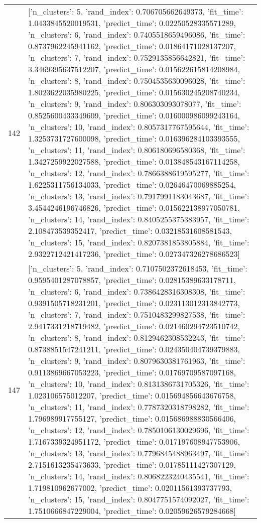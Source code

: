 \begin{tabular}{rl}
142 & [{'n_clusters': 5, 'rand_index': 0.706705662649373, 'fit_time': 1.0433845520019531, 'predict_time': 0.02250528335571289}, {'n_clusters': 6, 'rand_index': 0.7405518659496086, 'fit_time': 0.8737962245941162, 'predict_time': 0.01864171028137207}, {'n_clusters': 7, 'rand_index': 0.7529135856642821, 'fit_time': 3.3469395637512207, 'predict_time': 0.015622615814208984}, {'n_clusters': 8, 'rand_index': 0.7504535630096028, 'fit_time': 1.8023622035980225, 'predict_time': 0.015630245208740234}, {'n_clusters': 9, 'rand_index': 0.806303093078077, 'fit_time': 0.8525600433349609, 'predict_time': 0.016000986099243164}, {'n_clusters': 10, 'rand_index': 0.8057317767595644, 'fit_time': 1.3253731727600098, 'predict_time': 0.016396284103393555}, {'n_clusters': 11, 'rand_index': 0.806180696580368, 'fit_time': 1.3427259922027588, 'predict_time': 0.013848543167114258}, {'n_clusters': 12, 'rand_index': 0.7866388619595277, 'fit_time': 1.6225311756134033, 'predict_time': 0.02646470069885254}, {'n_clusters': 13, 'rand_index': 0.7917991183043687, 'fit_time': 3.4544246196746826, 'predict_time': 0.015622138977050781}, {'n_clusters': 14, 'rand_index': 0.8405255375383957, 'fit_time': 2.108473539352417, 'predict_time': 0.03218531608581543}, {'n_clusters': 15, 'rand_index': 0.8207381853805884, 'fit_time': 2.9322712421417236, 'predict_time': 0.027347326278686523}] \\
147 & [{'n_clusters': 5, 'rand_index': 0.7107502372618453, 'fit_time': 0.9595401287078857, 'predict_time': 0.02815389633178711}, {'n_clusters': 6, 'rand_index': 0.7386428316308308, 'fit_time': 0.9391505718231201, 'predict_time': 0.023113012313842773}, {'n_clusters': 7, 'rand_index': 0.7510483299827538, 'fit_time': 2.9417331218719482, 'predict_time': 0.021460294723510742}, {'n_clusters': 8, 'rand_index': 0.8129462308532243, 'fit_time': 0.8738851547241211, 'predict_time': 0.024350404739379883}, {'n_clusters': 9, 'rand_index': 0.8079630381761963, 'fit_time': 0.9113869667053223, 'predict_time': 0.01769709587097168}, {'n_clusters': 10, 'rand_index': 0.8131386731705326, 'fit_time': 1.023106575012207, 'predict_time': 0.015694856643676758}, {'n_clusters': 11, 'rand_index': 0.7787320318798282, 'fit_time': 1.796989917755127, 'predict_time': 0.015686988830566406}, {'n_clusters': 12, 'rand_index': 0.7850106130029696, 'fit_time': 1.7167339324951172, 'predict_time': 0.017197608947753906}, {'n_clusters': 13, 'rand_index': 0.7796845488963497, 'fit_time': 2.7151613235473633, 'predict_time': 0.01785111427307129}, {'n_clusters': 14, 'rand_index': 0.8068223240435541, 'fit_time': 1.719810962677002, 'predict_time': 0.02011561393737793}, {'n_clusters': 15, 'rand_index': 0.8047751574092027, 'fit_time': 1.7510666847229004, 'predict_time': 0.02059626579284668}] \\

\end{tabular}
